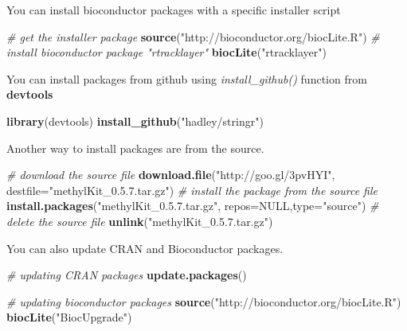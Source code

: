 \documentclass[12pt,]{krantz}
\newenvironment{Shaded}{\begin{snugshade}}{\end{snugshade}}
\newcommand{\CommentTok}[1]{\textcolor[rgb]{0.56,0.35,0.01}{\textit{#1}}}
\newcommand{\DataTypeTok}[1]{\textcolor[rgb]{0.13,0.29,0.53}{#1}}
\newcommand{\KeywordTok}[1]{\textcolor[rgb]{0.13,0.29,0.53}{\textbf{#1}}}
\newcommand{\NormalTok}[1]{#1}
\newcommand{\OtherTok}[1]{\textcolor[rgb]{0.56,0.35,0.01}{#1}}
\newcommand{\StringTok}[1]{\textcolor[rgb]{0.31,0.60,0.02}{#1}}
\begin{document}
You can install bioconductor packages with a specific installer script

\begin{Shaded}
\begin{Highlighting}[]
\CommentTok{# get the installer package}
\KeywordTok{source}\NormalTok{(}\StringTok{"http://bioconductor.org/biocLite.R"}\NormalTok{)}
\CommentTok{# install bioconductor package "rtracklayer"}
\KeywordTok{biocLite}\NormalTok{(}\StringTok{"rtracklayer"}\NormalTok{)}
\end{Highlighting}
\end{Shaded}

You can install packages from github using \emph{install\_github()} function from \textbf{devtools}

\begin{Shaded}
\begin{Highlighting}[]
\KeywordTok{library}\NormalTok{(devtools)}
\KeywordTok{install_github}\NormalTok{(}\StringTok{"hadley/stringr"}\NormalTok{)}
\end{Highlighting}
\end{Shaded}

Another way to install packages are from the source.

\begin{Shaded}
\begin{Highlighting}[]
\CommentTok{# download the source file}
\KeywordTok{download.file}\NormalTok{(}\StringTok{"http://goo.gl/3pvHYI"}\NormalTok{,}
               \DataTypeTok{destfile=}\StringTok{"methylKit_0.5.7.tar.gz"}\NormalTok{)}
\CommentTok{# install the package from the source file}
\KeywordTok{install.packages}\NormalTok{(}\StringTok{"methylKit_0.5.7.tar.gz"}\NormalTok{,}
                 \DataTypeTok{repos=}\OtherTok{NULL}\NormalTok{,}\DataTypeTok{type=}\StringTok{"source"}\NormalTok{)}
\CommentTok{# delete the source file}
\KeywordTok{unlink}\NormalTok{(}\StringTok{"methylKit_0.5.7.tar.gz"}\NormalTok{)}
\end{Highlighting}
\end{Shaded}

You can also update CRAN and Bioconductor packages.

\begin{Shaded}
\begin{Highlighting}[]
\CommentTok{# updating CRAN packages}
\KeywordTok{update.packages}\NormalTok{()}

\CommentTok{# updating bioconductor packages}
\KeywordTok{source}\NormalTok{(}\StringTok{"http://bioconductor.org/biocLite.R"}\NormalTok{)}
\KeywordTok{biocLite}\NormalTok{(}\StringTok{"BiocUpgrade"}\NormalTok{)}
\end{Highlighting}
\end{Shaded}
\end{document}
